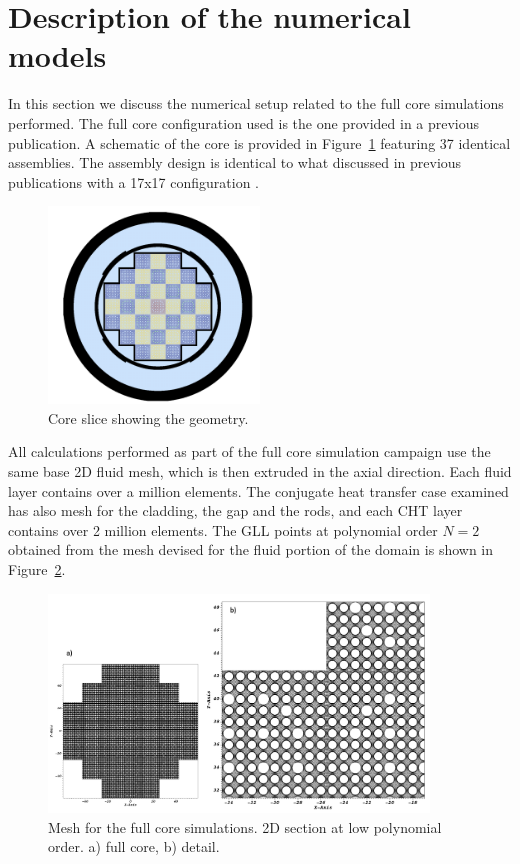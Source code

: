 \section{Description of the numerical models}
\label{sec:model}

In this section we discuss the numerical setup related to the full core simulations performed.
The full core configuration used is the one provided in a previous publication. A schematic of the core is provided in Figure~\ref{fig:core} featuring 37 identical assemblies. The assembly design is identical to what discussed in previous publications with a 17x17 configuration
\cite{merzari2020wall}.

\begin{figure}[!ht]
\centering
\includegraphics[width=0.5\textwidth]{./figures/core_slice.png}
\caption{Core slice showing the geometry.}
\label{fig:core}
\end{figure}

All calculations performed as part of the full core simulation campaign use the same base 2D fluid mesh, which is then extruded in the axial direction. Each fluid layer contains over a million elements. The conjugate heat transfer case examined has also mesh for the cladding, the gap and the rods, and each CHT layer contains over 2 million elements. The GLL points at polynomial order $N=2$ obtained from the mesh devised for the fluid portion of the domain is shown in Figure~\ref{fig:mesh1}.

\begin{figure}[!ht]
\centering
\includegraphics[width=0.9\textwidth]{./figures/full_core_mesh.png}
\caption{Mesh for the full core simulations. 2D section at low polynomial order. a) full core, b) detail.}
\label{fig:mesh1}
\end{figure}

